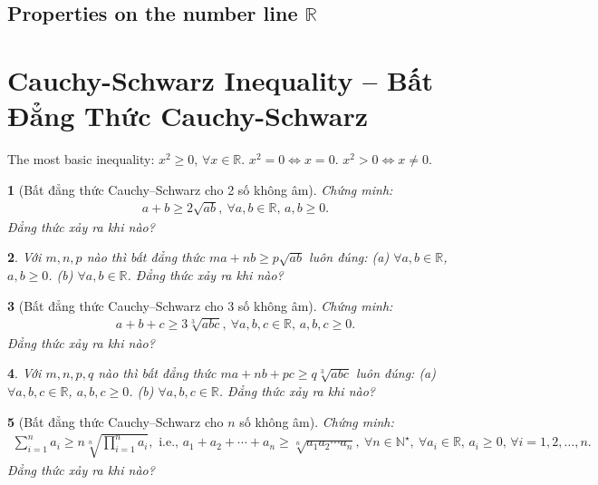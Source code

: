 \documentclass{article}
\newtheorem{baitoan}{}
\begin{document}
\subsection{Properties on the number line $\mathbb{R}$}



\section{Cauchy-Schwarz Inequality -- Bất Đẳng Thức Cauchy-Schwarz}
The most basic inequality: $x^2\ge0$, $\forall x\in\mathbb{R}$. $x^2 = 0\Leftrightarrow x = 0$. $x^2 > 0\Leftrightarrow x\ne0$.

\begin{baitoan}[Bất đẳng thức Cauchy--Schwarz cho 2 số không âm]
	Chứng minh:
	\begin{align*}
		\boxed{a + b\ge2\sqrt{ab},\ \forall a,b\in\mathbb{R},\,a,b\ge 0.}
	\end{align*}
	Đẳng thức xảy ra khi nào?
\end{baitoan}

\begin{baitoan}
	Với $m,n,p$ nào thì bất đẳng thức $ma + nb\ge p\sqrt{ab}$ luôn đúng: (a) $\forall a,b\in\mathbb{R}$, $a,b\ge0$. (b) $\forall a,b\in\mathbb{R}$. Đẳng thức xảy ra khi nào?
\end{baitoan}

\begin{baitoan}[Bất đẳng thức Cauchy--Schwarz cho 3 số không âm]
	Chứng minh:
	\begin{align*}
		\boxed{a + b + c\ge3\sqrt[3]{abc},\ \forall a,b,c\in\mathbb{R},\,a,b,c\ge 0.}
	\end{align*}
	Đẳng thức xảy ra khi nào?
\end{baitoan}

\begin{baitoan}
	Với $m,n,p,q$ nào thì bất đẳng thức $ma + nb + pc\ge q\sqrt[3]{abc}$ luôn đúng: (a) $\forall a,b,c\in\mathbb{R}$, $a,b,c\ge0$. (b) $\forall a,b,c\in\mathbb{R}$. Đẳng thức xảy ra khi nào?
\end{baitoan}

\begin{baitoan}[Bất đẳng thức Cauchy--Schwarz cho $n$ số không âm]
	Chứng minh:
	\begin{align*}
		\sum_{i=1}^n a_i\ge n\sqrt[n]{\prod_{i=1}^n a_i},\mbox{ i.e., } a_1 + a_2 + \cdots + a_n\ge\sqrt[n]{a_1a_2\cdots a_n},\ \forall n\in\mathbb{N}^\star,\ \forall a_i\in\mathbb{R},\,a_i\ge0,\,\forall i = 1,2,\ldots,n.
	\end{align*}
	Đẳng thức xảy ra khi nào?
\end{baitoan}
\end{document}
